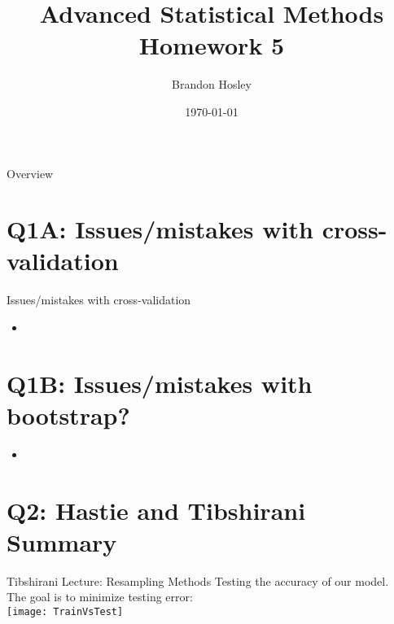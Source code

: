 \documentclass{beamer}
\title{Advanced Statistical Methods \\ Homework 5}
\author{Brandon Hosley}
\institute{University of Illinois - Springfield}
\date{\today}
\begin{document}
\frame{\titlepage}

\begin{frame}{Overview}
\tableofcontents
\end{frame}

\section[Q1A]{Q1A: Issues/mistakes with cross-validation}

\begin{frame}{Issues/mistakes with cross-validation}
	\begin{itemize}[<+->]
		\item 
	\end{itemize}
	
\end{frame}

\section[Q1B]{Q1B: Issues/mistakes with bootstrap?}
\begin{frame}{}
	\begin{itemize}[<+->]
		\item 
	\end{itemize}
\end{frame}

\section[Q2]{Q2: Hastie and Tibshirani Summary}

\begin{frame}{Tibshirani Lecture: Resampling Methods}
	Testing the accuracy of our model. \\
	The goal is to minimize testing error: \\
	\vspace{1em}
	\centering 
	\texttt{[image: TrainVsTest]}
	\vspace{1em}
\end{frame}
\end{document}
